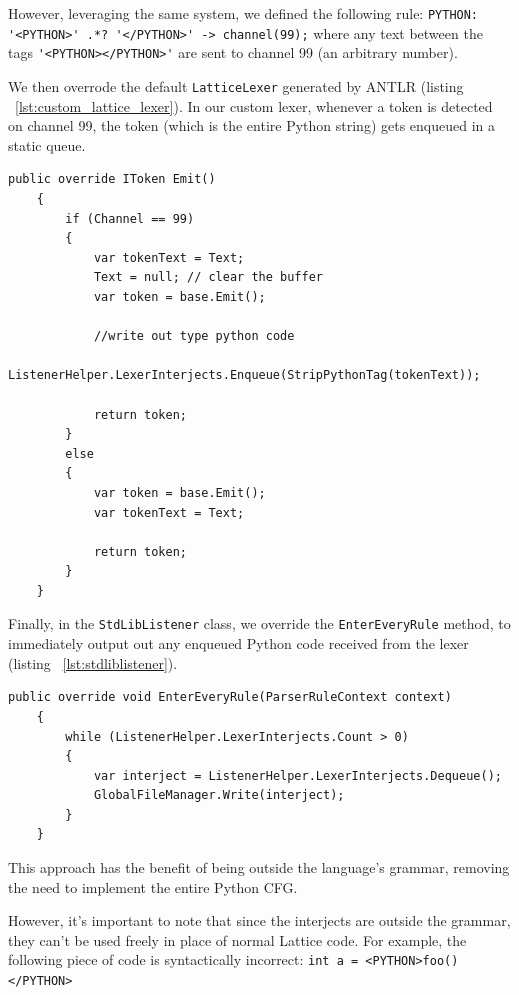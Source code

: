 However, leveraging the same system, we defined the following rule: \lstinline{PYTHON: '<PYTHON>' .*? '</PYTHON>' -> channel(99);}
where any text between the tags \lstinline{'<PYTHON></PYTHON>'} are sent to channel 99 (an arbitrary number).

We then overrode the default \lstinline{LatticeLexer} generated by ANTLR (listing ~\ref{lst:custom_lattice_lexer}).
In our custom lexer, whenever a token is detected on channel 99, the token (which is the entire Python string)
gets enqueued in a static queue.

\begin{lstlisting}[caption={Excerpt from the class CustomLatticeLexer},captionpos=b, label={lst:custom_lattice_lexer}]
    public override IToken Emit()
    {
        if (Channel == 99)
        {
            var tokenText = Text;
            Text = null; // clear the buffer
            var token = base.Emit();

            //write out type python code
            ListenerHelper.LexerInterjects.Enqueue(StripPythonTag(tokenText));

            return token;
        }
        else
        {
            var token = base.Emit();
            var tokenText = Text;

            return token;
        }
    }
\end{lstlisting}
Finally, in the \lstinline{StdLibListener} class, we override the \lstinline{EnterEveryRule} method, to immediately
output out any enqueued Python code received from the lexer (listing ~\ref{lst:stdliblistener}).

\begin{lstlisting}[caption={Excerpt from the class StdLibListener},captionpos=b, label={lst:stdliblistener}]
    public override void EnterEveryRule(ParserRuleContext context)
    {
        while (ListenerHelper.LexerInterjects.Count > 0)
        {
            var interject = ListenerHelper.LexerInterjects.Dequeue();
            GlobalFileManager.Write(interject);
        }
    }
\end{lstlisting}

This approach has the benefit of being outside the language's grammar, removing the need to implement the entire Python
CFG.

However, it's important to note that since the interjects are outside the grammar, they can't be used freely in place
of normal Lattice code.
For example, the following piece of code is syntactically incorrect: \lstinline{int a = <PYTHON>foo()</PYTHON>}

